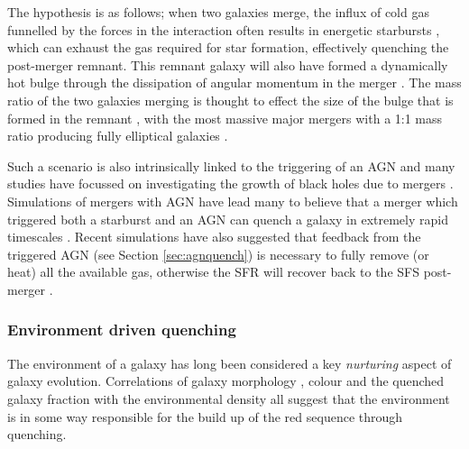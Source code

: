 The hypothesis is as follows; when two galaxies merge, the influx of cold gas funnelled by the forces in the interaction often results in energetic starbursts \citep{mihos94, mihos96, hopkins06d, hopkins08a, hopkins08b, snyder11, hayward14, sparre16}, which can exhaust the gas required for star formation, effectively quenching the post-merger remnant. This remnant galaxy will also have formed a dynamically hot bulge through the dissipation of angular momentum in the merger \citep{toomre77, walker96, kormendy04, hopkins11c, martig12}. The mass ratio of the two galaxies merging is thought to effect the size of the bulge that is formed in the remnant \citep{cox08, hopkins09c, tonini16}, with the most massive major mergers with a 1:1 mass ratio producing fully elliptical galaxies \citep{toomre72, barnes96, mihos96, kauffmann96, pontzen16}.

Such a scenario is also intrinsically linked to the triggering of an AGN \citep{sanders88, dimatteo05, hopkins09a, treister12} and many studies have focussed on investigating the growth of black holes due to mergers \citep[e.g.][]{veilleux02, bellovary13, ellison13, medling15, gabor16}. Simulations of mergers with AGN have lead many to believe that a merger which triggered both a starburst and an AGN can quench a galaxy in extremely rapid timescales \citep{springel05b, bell06}. Recent simulations have also suggested that feedback from the triggered AGN (see Section \ref{sec:agnquench}) is necessary to fully remove (or heat) all the available gas, otherwise the SFR will recover back to the SFS post-merger \citep{pontzen16, sparre16}. 

\subsubsection{Environment driven quenching}\label{sec:envquench}

The environment of a galaxy has long been considered a key  \emph{nurturing} aspect of galaxy evolution. Correlations of galaxy morphology \citep{dressler80, smail97, poggianti99, postman05, Bamford09}, colour \citep{butcher78, pimbblet02} and the quenched galaxy fraction \citep{kauffmann03, Baldry06, peng12, darvish16} with the environmental density all suggest that the environment is in some way responsible for the build up of the red sequence through quenching. 

